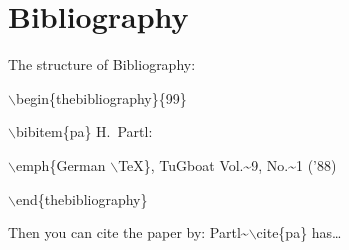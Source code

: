 \documentclass[11pt,a4paper]{article}
\begin{document}
\section{Bibliography}
The structure of Bibliography:\\
\begin{description}
    \item$\backslash$begin\{thebibliography\}\{99\}\\
    \item$\backslash$bibitem\{pa\} H.~Partl:\\
    \item$\backslash$emph\{German $\backslash$TeX\},
        TuGboat Vol.\~{}9, No.\~{}1 ('88)\\
    \item$\backslash$end\{thebibliography\}\\
\end{description}
Then you can cite the paper by: Partl\~{}$\backslash$cite\{pa\} has\ldots
\end{document}
